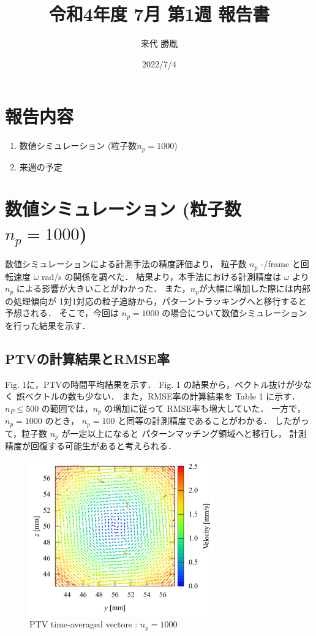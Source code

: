 \documentclass[twocolumn,a4j]{jsarticle}
\author{来代 勝胤}
\title{令和4年度 7月 第1週 報告書}
\date{2022/7/4}
\begin{document}
\columnseprule=0.1mm
\maketitle

\section*{報告内容}
\begin{enumerate}[1.]
  \item 数値シミュレーション (粒子数$n_p=1000$)
  \item 来週の予定
\end{enumerate}

\section{数値シミュレーション (粒子数$n_p=1000$)}
数値シミュレーションによる計測手法の精度評価より，
粒子数 $n_p$ -/frame と回転速度 $\omega$ rad/s の関係を調べた．
結果より，本手法における計測精度は $\omega$ より
$n_p$ による影響が大きいことがわかった．
また，$n_p$が大幅に増加した際には内部の処理傾向が
1対1対応の粒子追跡から，パターントラッキングへと移行すると予想される．
そこで，今回は $n_p = 1000$ の場合について数値シミュレーションを行った結果を示す．\\

\subsection{PTVの計算結果とRMSE率}
Fig. 1に，PTVの時間平均結果を示す．
Fig. 1 の結果から，ベクトル抜けが少なく
誤ベクトルの数も少ない．
また，RMSE率の計算結果を Table 1 に示す．
$n_P \leq 500$ の範囲では，$n_p$ の増加に従って
RMSE率も増大していた．
一方で，$n_p = 1000$ のとき，
$n_p = 100$ と同等の計測精度であることがわかる．
したがって，粒子数 $n_p$ が一定以上になると
パターンマッチング領域へと移行し，
計測精度が回復する可能生があると考えられる．

\begin{figure}[htbp]
  \footnotesize
  \begin{center}
    \includegraphics[width=80mm]{../images/velocity_10-1000.png}
    \caption{PTV time-averaged vectors : $n_p = 1000$}
  \end{center}
\end{figure}
\end{document}
